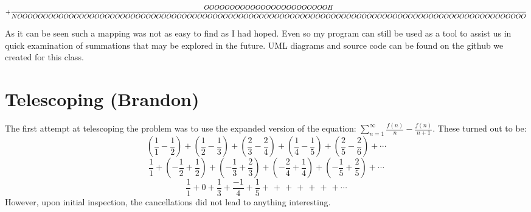 \documentclass{article}
\begin{document}
$$
+{OOOOOOOOOOOOOOOOOOOOOOOOH \over NOOOOOOOOOOOOOOOOOOOOOOOOOOOOOOOOOOOOOOOOOOOOOOOOOOOOOOOOOOOOOOOOOOOOOOOOOOOOOOOOOOOOOOOOOOOOOOOOOOO}
$$

As it can be seen such a mapping was not as easy to find as I had hoped. Even so my program can still be used as a tool to assist us in quick examination of
summations that may be explored in the future. UML diagrams and source code can be found on the github we created for this class.

\section{Telescoping (Brandon)}
The first attempt at telescoping the problem was to use the expanded version of the equation: $\sum_{n=1}^\infty \frac{f(n)}{n} - \frac{f(n)}{n+1}$. These turned out to be:\\
$$\left(\frac{1}{1}-\frac{1}{2}\right)+\left(\frac{1}{2}-\frac{1}{3}\right)+\left(\frac{2}{3}-\frac{2}{4}\right)+\left(\frac{1}{4}-\frac{1}{5}\right)+\left(\frac{2}{5}-\frac{2}{6}\right)+\cdots$$
$$\frac{1}{1} + \left(-\frac{1}{2}+\frac{1}{2}\right) + \left(-\frac{1}{3}+\frac{2}{3}\right) +\left(-\frac{2}{4}+\frac{1}{4}\right)+\left(-\frac{1}{5}+\frac{2}{5}\right)+\cdots$$
$$\frac{1}{1}+0+\frac{1}{3}+\frac{-1}{4}+\frac{1}{5}+\frac{}{}+\frac{}{}+\frac{}{}+\frac{}{}+\frac{}{}+\frac{}{}+\cdots$$
However, upon initial inspection, the cancellations did not lead to anything interesting.
\end{document}
